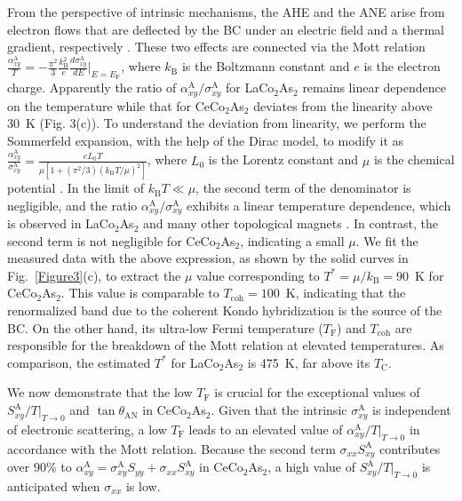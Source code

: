 \documentclass[aps,prl,preprint,superscriptaddress]{revtex4-2}
\begin{document}
From the perspective of intrinsic mechanisms, the AHE and the ANE arise from electron flows that are deflected by the BC under an electric field and a thermal gradient, respectively \cite{2015FundamentalsBehnia, Behnia2022TEP}. These two effects are connected via the Mott relation $\frac{\alpha^{\mathrm{A}}_{xy}}{T}= -\frac{\pi^2}{3} \frac{k^2_{\mathrm{B}}}{e} \frac{d\sigma^{\mathrm{A}}_{xy}}{d E}\Big|_{E = E_{\mathrm{F}}}$, where $k_{\mathrm{B}}$ is the Boltzmann constant and $e$ is the electron charge.
Apparently the ratio of $\alpha^{\mathrm{A}}_{xy}/\sigma^{\mathrm{A}}_{xy}$ for LaCo$_2$As$_2$ remains linear dependence on the temperature while that for CeCo$_2$As$_2$ deviates from the linearity above 30~K (Fig. 3(c)). To understand the deviation from linearity, we perform the Sommerfeld expansion, with the help of the Dirac model, to modify it as
$\frac{\alpha^{\mathrm{A}}_{xy}}{\sigma^{\mathrm{A}}_{xy}}=\frac{eL_0T}{\mu[1+(\pi^2/3)(k_{\mathrm{B}}T/\mu)^2]}$, where $L_0$ is the Lorentz constant and $\mu$ is the chemical potential \cite{Lu2023Mott}.
In the limit of $ k_{\mathrm{B}}T \ll \mu$, the second term of the denominator is negligible, and the ratio $\alpha^{\mathrm{A}}_{xy}/\sigma^{\mathrm{A}}_{xy}$ exhibits a linear temperature dependence, which is observed in LaCo$_2$As$_2$ and many other topological magnets \cite{crossoverbehaviorTukura2007,Pu2008GaMnAs,Mn3GeXu2020,Xu2020Mott,Xu2022Tb166}.
In contrast, the second term is not negligible for CeCo$_2$As$_2$, indicating a small $\mu$.
We fit the measured data with the above expression, as shown by the solid curves in Fig.~\ref{Figure3}(c), to extract the $\mu$ value corresponding to $T^{\ast}=\mu/k_{\mathrm{B}}=90$~K for CeCo$_2$As$_2$.
This value is comparable to $T_{\mathrm{coh}}=100$~K, indicating that the renormalized band due to the coherent Kondo hybridization is the source of the BC. On the other hand, its ultra-low Fermi temperature ($T_{\mathrm{F}}$) and $T_{\mathrm{coh}}$ are responsible for the breakdown of the Mott relation at elevated temperatures.
As comparison, the estimated $T^{\ast}$ for LaCo$_2$As$_2$ is 475~K, far above its $T_{\mathrm{C}}$.


We now demonstrate that the low $T_{\mathrm{F}}$ is crucial for the exceptional values of $S^{\mathrm{A}}_{xy}/T|_{T\rightarrow0}$ and $\tan\theta_{\mathrm{AN}}$ in CeCo$_2$As$_2$.
Given that the intrinsic $\sigma^{\mathrm{A}}_{xy}$ is independent of electronic scattering, a low $T_{\mathrm{F}}$ leads to an elevated value of  $\alpha_{xy}^{\mathrm{A}}/T|_{T\rightarrow0}$ in accordance with the Mott relation.
Because the second term $\sigma_{xx} S^{\mathrm{A}}_{xy}$ contributes over 90\% to $\alpha^{\mathrm{A}}_{xy}=\sigma^{\mathrm{A}}_{xy}S_{yy}+\sigma_{xx} S^{\mathrm{A}}_{xy}$ in CeCo$_2$As$_2$, a high value of $S^{\mathrm{A}}_{xy}/T|_{T\rightarrow0}$ is anticipated when $\sigma_{xx}$ is low.
\end{document}
